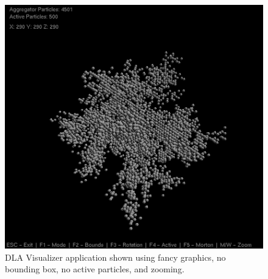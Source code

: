 \documentclass[fleqn,10pt]{UserGuideArx} %
\begin{document}
\begin{figure}[!ht]\centering %
    \includegraphics[width=\linewidth]{images/FancyNoBound.png}
    \caption{DLA Visualizer application shown using fancy graphics, no bounding box, no active particles, and zooming.}
    \label{fig:FancyNoBound}
    \end{figure}
\end{document}
